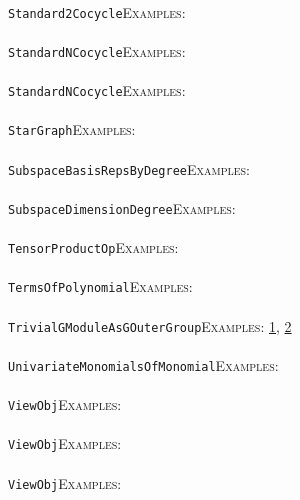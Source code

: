 \documentclass[a4paper,11pt]{report}
\begin{document}
{{ \\
 \texttt{Standard2Cocycle}{\nobreakspace}{\nobreakspace}{\nobreakspace}{\nobreakspace}\textsc{Examples:} \\
 \\
 \texttt{StandardNCocycle}{\nobreakspace}{\nobreakspace}{\nobreakspace}{\nobreakspace}\textsc{Examples:} \\
 \\
 \texttt{StandardNCocycle}{\nobreakspace}{\nobreakspace}{\nobreakspace}{\nobreakspace}\textsc{Examples:} \\
 \\
 \texttt{StarGraph}{\nobreakspace}{\nobreakspace}{\nobreakspace}{\nobreakspace}\textsc{Examples:} \\
 \\
 \texttt{SubspaceBasisRepsByDegree}{\nobreakspace}{\nobreakspace}{\nobreakspace}{\nobreakspace}\textsc{Examples:} \\
 \\
 \texttt{SubspaceDimensionDegree}{\nobreakspace}{\nobreakspace}{\nobreakspace}{\nobreakspace}\textsc{Examples:} \\
 \\
 \texttt{TensorProductOp}{\nobreakspace}{\nobreakspace}{\nobreakspace}{\nobreakspace}\textsc{Examples:} \\
 \\
 \texttt{TermsOfPolynomial}{\nobreakspace}{\nobreakspace}{\nobreakspace}{\nobreakspace}\textsc{Examples:} \\
 \\
 \texttt{TrivialGModuleAsGOuterGroup}{\nobreakspace}{\nobreakspace}{\nobreakspace}{\nobreakspace}\textsc{Examples:} \href{../www/SideLinks/About/aboutCoefficientSequence.html} {1}{\nobreakspace}, \href{../www/SideLinks/About/aboutGouter.html} {2}{\nobreakspace} \\
 \\
 \texttt{UnivariateMonomialsOfMonomial}{\nobreakspace}{\nobreakspace}{\nobreakspace}{\nobreakspace}\textsc{Examples:} \\
 \\
 \texttt{ViewObj}{\nobreakspace}{\nobreakspace}{\nobreakspace}{\nobreakspace}\textsc{Examples:} \\
 \\
 \texttt{ViewObj}{\nobreakspace}{\nobreakspace}{\nobreakspace}{\nobreakspace}\textsc{Examples:} \\
 \\
 \texttt{ViewObj}{\nobreakspace}{\nobreakspace}{\nobreakspace}{\nobreakspace}\textsc{Examples:} \\
}}
\end{document}
